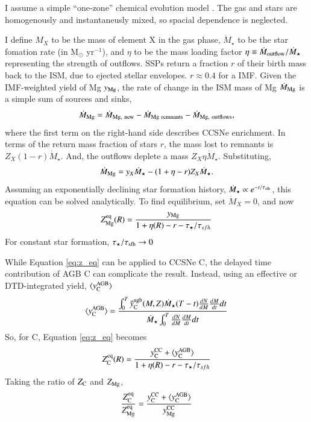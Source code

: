 \documentclass[12pt,oneside]{report}
\newcommand{\Ycc}{\ensuremath{y_{\rm C}^{\rm CC}}}
\newcommand{\Yoc}{\ensuremath{y_{\rm Mg}^{\rm CC}}}
\newcommand{\Ycagb}{\ensuremath{y_{\rm C}^{\rm AGB}}}
\begin{document}
I assume a simple ``one-zone'' chemical evolution model \cite[e.g.][]{tinsley80, pagel09, matteucci21}.  The gas and stars are homogenously and instantaneusly mixed, so spacial dependence is neglected.

I define $M_{X}$ to be the mass of element X in the gas phase, $\dot{M}_\star$ to be the star fomation rate (in M$_\odot$ yr$^{-1}$), and $\eta$ to be the mass loading factor $\eta\equiv\dot{M}_{\rm outflow}/\dot{M}_\star$ representing the strength of outflows. 
SSPs return a fraction $r$ of their birth mass back to the ISM, due to ejected stellar envelopes. $r\approx0.4$ for a \citet{kroupa01} IMF.
Given the IMF-weighted yield of Mg $y_{\rm Mg}$, the rate of change in the ISM mass of Mg $\dot{M}_{\rm Mg}$ is a simple sum of sources and sinks,
\begin{equation}
    \dot{M}_{\rm Mg} = \dot{M}_{\rm Mg,~new} - \dot{M}_{\rm Mg~remnants} - \dot{M}_{\rm Mg,~outflows},
\end{equation}
where the first term on the right-hand side describes CCSNe enrichment. 
In terms of the return mass fraction of stars $r$, the mass lost to remnants is $Z_X (1-r)\dot{M}_\star$.  And, the outflows deplete a mass $Z_X \eta\dot{M}_\star$. Substituting, 
\begin{equation}
    \dot{M}_{\rm Mg}= y_{X} \dot{M}_\star - (1 + \eta - r) Z_{X} \dot{M}_\star.
\end{equation}
Assuming an exponentially declining star formation history, $\dot{M}_\star \propto e^{-t/\tau_{\rm sfh}}$, this equation can be solved analytically. 
To find equilibrium, set $\dot{M}_X=0$, and now
\begin{equation}\label{eq:z_eq}
    Z_{\rm Mg}^{\rm eq}(R) = \frac{y_{\rm Mg}}{1 + \eta(R) - r - \tau_\star / \tau_{sfh}}
\end{equation}
For constant star formation, $\tau_\star/\tau_{\rm sfh} \rightarrow 0$

While Equation \ref{eq:z_eq} can be applied to CCSNe C, the delayed time contribution of AGB C can complicate the result. Instead, using an effective or DTD-integrated yield, $\langle \Ycagb \rangle$
\begin{equation}
    \langle \Ycagb\rangle = \frac{\int_0^T \tilde{y}_{\rm C}^{\rm agb}(M, Z) \dot{M}_\star(T - t) \frac{dN}{dM} \frac{dM}{dt} dt  }{ \dot{M}_\star \int_0^T \frac{dN}{dM} \frac{dM}{dt} dt}
\end{equation}
So, for C, Equation \ref{eq:z_eq} becomes
\begin{equation}
    Z_{\rm C}^{\rm eq}(R) = \frac{\Ycc + \langle\Ycagb\rangle}{1 + \eta(R) - r - \tau_\star / \tau_{sfh}}
\end{equation}
Taking the ratio of $Z_{\rm C}$ and $Z_{\rm Mg}$, 
\begin{equation}\label{eq:z_co}
    \frac{Z_{\rm C}^{\rm eq}}{Z_{\rm Mg}^{\rm eq}} = \frac{\Ycc + \langle \Ycagb \rangle }{\Yoc}
\end{equation}
\end{document}
